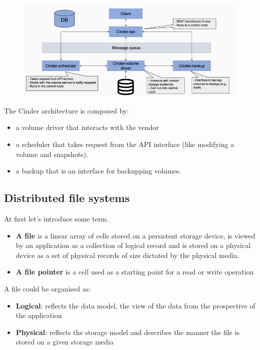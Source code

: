     \begin{figure}[h!]
        \centering
        \includegraphics[scale=0.5]{images/Cinder architecture.png}
    \end{figure}
    
    The Cinder architecture is composed by:
    \begin{itemize}
        \item a volume driver that interacts with the vendor
        \item a scheduler that takes request from the API interface (like modifying a volume and snapshots).
        \item a backup that is an interface for backupping volumes.
    \end{itemize}




\subsection{Distributed file systems}

At first let's introduce some term.
\begin{itemize}
    \item \textbf{A file} is a linear array of cells stored on a persistent storage device, is viewed by an application as a collection of logical record and is stored on a physical device as a set of physical records of size dictated by the physical media.
    \item \textbf{A file pointer} is a cell used as a starting point for a read or write operation
\end{itemize}
A file could be organised as:
\begin{itemize}
    \item \textbf{Logical}: reflects the data model, the view of the data from the prospective of the application
    \item \textbf{Physical}: reflects the storage model and describes the manner the file is stored on a given storage media
\end{itemize}

